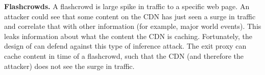 {\bf Flashcrowds.}  A flashcrowd is large spike in traffic to a specific web page.  An attacker 
could see that some content on the CDN has just seen a surge in traffic and correlate that with 
other information (for example, major world events).  This leaks information about what the content the 
CDN is caching.  Fortunately, the design of \system{} can defend against this type of inference attack.  
The exit proxy can cache content in time of a flashcrowd, such that the CDN (and therefore the attacker) 
does not see the surge in traffic.  
